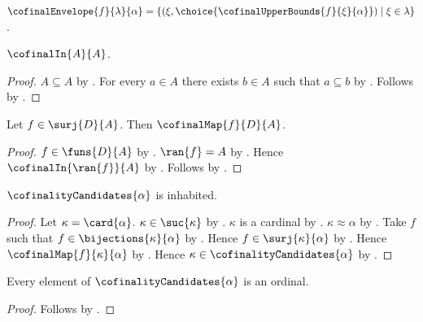 \begin{definition}\label{cofinal_envelope}
    $\cofinalEnvelope{f}{\lambda}{\alpha}
        =\{(\xi,\choice{\cofinalUpperBounds{f}{\xi}{\alpha}})
            \mid \xi\in\lambda\}$.
\end{definition}

\begin{proposition}\label{set_is_cofinal_in_itself}
    $\cofinalIn{A}{A}$.
\end{proposition}
\begin{proof}
    $A\subseteq A$ by .
    For every $a\in A$ there exists $b\in A$ such that $a\subseteq b$
        by .
    Follows by .
\end{proof}

\begin{proposition}\label{surjection_is_cofinal_map}
    Let $f\in\surj{D}{A}$.
    Then $\cofinalMap{f}{D}{A}$.
\end{proposition}
\begin{proof}
    $f\in\funs{D}{A}$ by .
    $\ran{f}=A$ by .
    Hence $\cofinalIn{\ran{f}}{A}$
        by .
    Follows by .
\end{proof}

\begin{proposition}\label{cofinality_candidates_inhabited}
    $\cofinalityCandidates{\alpha}$ is inhabited.
\end{proposition}
\begin{proof}
    Let $\kappa=\card{\alpha}$.
    $\kappa\in\suc{\kappa}$ by .
    $\kappa$ is a cardinal by .
    $\kappa\approx\alpha$ by .
    Take $f$ such that $f\in\bijections{\kappa}{\alpha}$
        by .
    Hence $f\in\surj{\kappa}{\alpha}$ by .
    Hence $\cofinalMap{f}{\kappa}{\alpha}$
        by .
    Hence $\kappa\in\cofinalityCandidates{\alpha}$
        by .
\end{proof}

\begin{proposition}\label{cofinality_candidates_are_ordinals}
    Every element of $\cofinalityCandidates{\alpha}$ is an ordinal.
\end{proposition}
\begin{proof}
    Follows by
        .
\end{proof}

